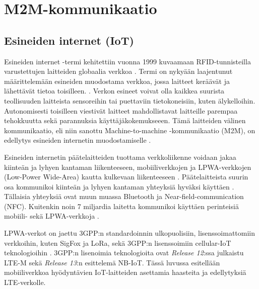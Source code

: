 \documentclass[finnish,12pt,a4paper,pdftex]{article}
\begin{document}
\section{M2M-kommunikaatio}

\subsection{Esineiden internet (IoT)}

Esineiden internet -termi kehitettiin vuonna 1999 kuvaamaan RFID-tunnisteilla varustettujen laitteiden globaalia verkkoa \cite{sundmaeker2010vision}. Termi on nykyään laajentunut määrittelemään esineiden muodostama verkkoa, jossa laitteet keräävät ja lähettävät tietoa toisilleen. \cite{atzori2010internet}. Verkon esineet voivat olla kaikkea suurista teollisuuden laitteista sensoreihin tai puettaviin tietokoneisiin, kuten älykelloihin. Autonomisesti toisilleen viestivät laitteet mahdollistavat laitteille parempaa tehokkuutta sekä parannuksia käyttäjäkokemukseeen. Tämä laitteiden välinen kommunikaatio, eli niin sanottu Machine-to-machine -kommunikaatio (M2M), on edellytys esineiden internetin muodostamiselle \cite{nokiawhitepaper}.



Esineiden internetin päätelaitteiden tuottama verkkoliikenne voidaan jakaa kiinteän ja lyhyen kantaman liikenteeseen, mobiiliverkkojen ja LPWA-verkkojen (Low-Power Wide-Area) kautta kulkevaan liikenteeseen \cite{nokiawhitepaper, harmaala}. Päätelaitteista suurin osa kommunikoi kiinteän ja lyhyen kantaman yhteyksiä hyväksi käyttäen \cite{nokiawhitepaper}. Tällaisia yhteyksiä ovat muun muassa Bluetooth ja Near-field-communication (NFC). Kuitenkin noin 7 miljardia laitetta kommunikoi käyttäen perinteisiä mobiili- sekä LPWA-verkkoja \cite{nokiawhitepaper}.

LPWA-verkot on jaettu 3GPP:n standardoinnin ulkopuolisiin, lisenssoimattomiin verkkoihin, kuten SigFox ja LoRa, sekä 3GPP:n lisenssoimiin cellular-IoT teknologioihin \cite{nokiawhitepaper}. 3GPP:n lisenoimia teknologioita ovat \textit{Release 12}:ssa julkaistu LTE-M sekä \textit{Release 13}:n esittelemä NB-IoT. Tässä luvussa esitellään mobiiliverkkoa hyödyntävien IoT-laitteiden asettamia haasteita ja edellytyksiä LTE-verkolle.
\end{document}
